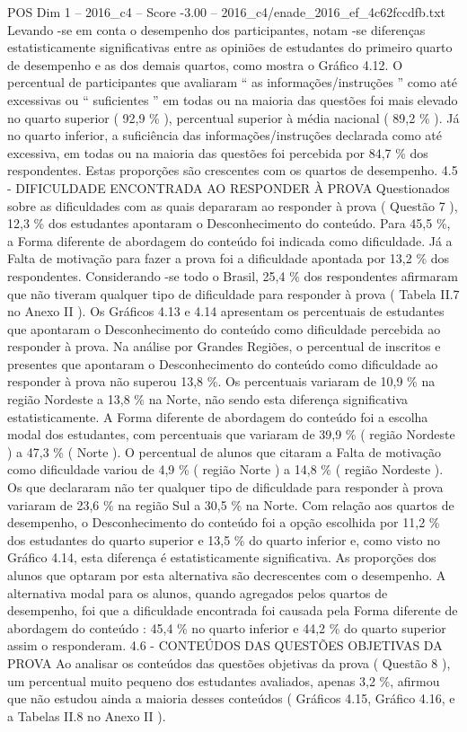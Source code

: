 \begin{textsample}{POS Dim 1 – 2016\_c4 – Score -3.00 – 2016\_c4/enade\_2016\_ef\_4c62fccdfb.txt}
Levando -se em conta o desempenho dos participantes, notam -se diferenças estatisticamente significativas entre as opiniões de estudantes do primeiro quarto de desempenho e as dos demais quartos, como mostra o Gráfico 4.12.
O percentual de participantes que avaliaram “ as informações/instruções ” como até excessivas ou “ suficientes ” em todas ou na maioria das questões foi mais elevado no quarto superior ( 92,9 \% ), percentual superior à média nacional ( 89,2 \% ).
Já no quarto inferior, a suficiência das informações/instruções declarada como até excessiva, em todas ou na maioria das questões foi percebida por 84,7 \% dos respondentes.
Estas proporções são crescentes com os quartos de desempenho. 4.5 - DIFICULDADE ENCONTRADA AO RESPONDER À PROVA Questionados sobre as dificuldades com as quais depararam ao responder à prova ( Questão 7 ), 12,3 \% dos estudantes apontaram o Desconhecimento do conteúdo.
Para 45,5 \%, a Forma diferente de abordagem do conteúdo foi indicada como dificuldade.
Já a Falta de motivação para fazer a prova foi a dificuldade apontada por 13,2 \% dos respondentes.
Considerando -se todo o Brasil, 25,4 \% dos respondentes afirmaram que não tiveram qualquer tipo de dificuldade para responder à prova ( Tabela II.7 no Anexo II ).
Os Gráficos 4.13 e 4.14 apresentam os percentuais de estudantes que apontaram o Desconhecimento do conteúdo como dificuldade percebida ao responder à prova.
Na análise por Grandes Regiões, o percentual de inscritos e presentes que apontaram o Desconhecimento do conteúdo como dificuldade ao responder à prova não superou 13,8 \%.
Os percentuais variaram de 10,9 \% na região Nordeste a 13,8 \% na Norte, não sendo esta diferença significativa estatisticamente.
A Forma diferente de abordagem do conteúdo foi a escolha modal dos estudantes, com percentuais que variaram de 39,9 \% ( região Nordeste ) a 47,3 \% ( Norte ).
O percentual de alunos que citaram a Falta de motivação como dificuldade variou de 4,9 \% ( região Norte ) a 14,8 \% ( região Nordeste ).
Os que declararam não ter qualquer tipo de dificuldade para responder à prova variaram de 23,6 \% na região Sul a 30,5 \% na Norte.
Com relação aos quartos de desempenho, o Desconhecimento do conteúdo foi a opção escolhida por 11,2 \% dos estudantes do quarto superior e 13,5 \% do quarto inferior e, como visto no Gráfico 4.14, esta diferença é estatisticamente significativa.
As proporções dos alunos que optaram por esta alternativa são decrescentes com o desempenho.
A alternativa modal para os alunos, quando agregados pelos quartos de desempenho, foi que a dificuldade encontrada foi causada pela Forma diferente de abordagem do conteúdo : 45,4 \% no quarto inferior e 44,2 \% do quarto superior assim o responderam. 4.6 - CONTEÚDOS DAS QUESTÕES OBJETIVAS DA PROVA Ao analisar os conteúdos das questões objetivas da prova ( Questão 8 ), um percentual muito pequeno dos estudantes avaliados, apenas 3,2 \%, afirmou que não estudou ainda a maioria desses conteúdos ( Gráficos 4.15, Gráfico 4.16, e a Tabelas II.8 no Anexo II ).

\end{textsample}
